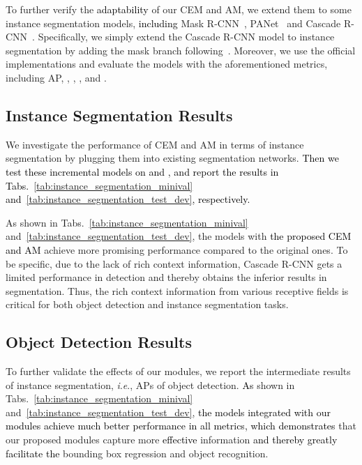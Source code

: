 \documentclass[journal]{IEEEtran}
\newcommand{\ie}{\textit{i}.\textit{e}.\xspace}
\def\qcr{\fontfamily{qcr}\selectfont}
\def\qi{\textcolor{black}}
\def\myblue{\textcolor{black}}
\begin{document}
	
	
To further verify the \myblue{adaptability} of our CEM and AM, we extend them to some instance segmentation models, \qi{including} Mask R-CNN~\cite{he2017mask}, PANet~\cite{liu2018path} and Cascade R-CNN~\cite{cai2018cascade}.
Specifically, we simply extend the Cascade R-CNN model to instance segmentation by adding the mask branch following~\cite{he2017mask}. 
	Moreover, we use the official implementations and evaluate the models with the aforementioned metrics, including AP, , , ,  and .




	


	


	


	
	\subsection{Instance Segmentation Results}
	
	We investigate the performance of CEM and AM in terms of instance segmentation by plugging them into existing segmentation networks. 
	\qi{Then we test these incremental models on {\qcr{minival}} and {\qcr{test-dev}}, and report the results in Tabs.~\ref{tab:instance_segmentation_minival} and~\ref{tab:instance_segmentation_test_dev}, respectively.}
	
	As shown in Tabs.~\ref{tab:instance_segmentation_minival} and~\ref{tab:instance_segmentation_test_dev}, the models with \myblue{the proposed CEM and AM} achieve more promising performance compared to the original ones. To be specific, due to the lack of rich context information, 
	Cascade R-CNN gets a limited performance in detection and thereby obtains the inferior results in segmentation.
	Thus, the rich context information from various receptive fields is critical for both object detection and instance segmentation tasks.
	
	\subsection{Object Detection Results}
	
	To further validate the effects of our modules, we report the intermediate results of instance segmentation, \ie, APs of object detection. 
	\myblue{As} shown in Tabs.~\ref{tab:instance_segmentation_minival} and~\ref{tab:instance_segmentation_test_dev}, 
\myblue{the models integrated with our modules achieve much better performance in all metrics, which demonstrates}
	that our proposed modules capture more \myblue{effective} information 
\myblue{and thereby greatly facilitate the}
	bounding box regression and object recognition.
	
\end{document}
